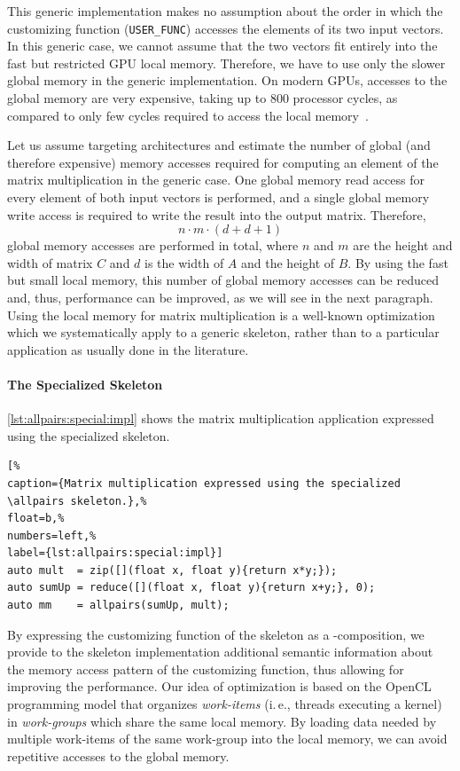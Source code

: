 This generic implementation makes no assumption about the order in which the customizing function (\texttt{USER\_FUNC}) accesses the elements of its two input vectors.
In this generic case, we cannot assume that the two vectors fit entirely into the fast but restricted GPU local memory.
Therefore, we have to use only the slower global memory in the generic implementation.
On modern GPUs, accesses to the global memory are very expensive, taking up to 800 processor cycles, as compared to only few cycles required to access the local memory~\cite{CUDAProgrammingGuide}.

Let us assume targeting \GPU architectures and estimate the number of global (and therefore expensive) memory accesses required for computing an element of the matrix multiplication in the generic case.
One global memory read access for every element of both input vectors is performed, and a single global memory write access is required to write the result into the output matrix.
Therefore, 
\begin{equation}
  n\cdot m\cdot (d + d + 1)
  \label{eq:mm:accesses}
\end{equation}
global memory accesses are performed in total, where $n$ and $m$ are the height and width of matrix $C$ and $d$ is the width of $A$ and the height of $B$.
By using the fast but small local memory, this number of global memory accesses can be reduced and, thus, performance can be improved, as we will see in the next paragraph.
Using the local memory for matrix multiplication is a well-known optimization which we systematically apply to a generic skeleton, rather than to a particular application as usually done in the literature.

\paragraph{The Specialized \allpairs Skeleton}
\autoref{lst:allpairs:special:impl} shows the matrix multiplication application expressed using the specialized \allpairs skeleton.
\begin{lstlisting}[%                                                             
caption={Matrix multiplication expressed using the specialized \allpairs skeleton.},%
float=b,%                                                                       
numbers=left,%
label={lst:allpairs:special:impl}]
auto mult  = zip([](float x, float y){return x*y;});
auto sumUp = reduce([](float x, float y){return x+y;}, 0);
auto mm    = allpairs(sumUp, mult);
\end{lstlisting}
%
By expressing the customizing function of the \allpairs skeleton as a \zip-\reduce composition, we provide to the skeleton implementation additional semantic information about the memory access pattern of the customizing function, thus allowing for improving the performance.
Our idea of optimization is based on the OpenCL programming model that organizes \emph{work-items} (i.\,e., threads executing a kernel) in \emph{work-groups} which share the same \GPU local memory.
By loading data needed by multiple work-items of the same work-group into the local memory, we can avoid repetitive accesses to the global memory.

